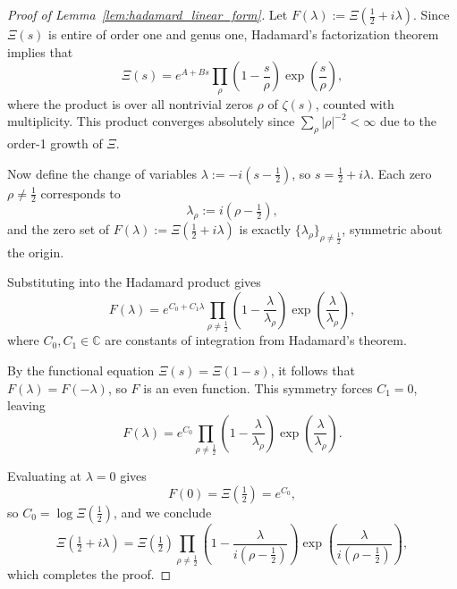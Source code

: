 \begin{proof}[Proof of Lemma~\ref{lem:hadamard_linear_form}]
Let \( F(\lambda) := \Xi\left( \tfrac{1}{2} + i\lambda \right) \). Since \( \Xi(s) \) is entire of order one and genus one, Hadamard’s factorization theorem \cite[Theorem~3.7.1]{Levin1996EntireLectures} implies that
\[
\Xi(s) = e^{A + B s} \prod_{\rho} \left( 1 - \frac{s}{\rho} \right) \exp\left( \frac{s}{\rho} \right),
\]
where the product is over all nontrivial zeros \( \rho \) of \( \zeta(s) \), counted with multiplicity. This product converges absolutely since \( \sum_\rho |\rho|^{-2} < \infty \) due to the order-1 growth of \( \Xi \).

\medskip
Now define the change of variables \( \lambda := -i(s - \tfrac{1}{2}) \), so \( s = \tfrac{1}{2} + i\lambda \). Each zero \( \rho \ne \tfrac{1}{2} \) corresponds to
\[
\lambda_\rho := i(\rho - \tfrac{1}{2}),
\]
and the zero set of \( F(\lambda) := \Xi(\tfrac{1}{2} + i\lambda) \) is exactly \( \{ \lambda_\rho \}_{\rho \ne \tfrac{1}{2}} \), symmetric about the origin.

Substituting into the Hadamard product gives
\[
F(\lambda) = e^{C_0 + C_1 \lambda} \prod_{\rho \ne \tfrac{1}{2}} \left( 1 - \frac{\lambda}{\lambda_\rho} \right) \exp\left( \frac{\lambda}{\lambda_\rho} \right),
\]
where \( C_0, C_1 \in \mathbb{C} \) are constants of integration from Hadamard's theorem.

\medskip
By the functional equation \( \Xi(s) = \Xi(1 - s) \), it follows that \( F(\lambda) = F(-\lambda) \), so \( F \) is an even function. This symmetry forces \( C_1 = 0 \), leaving
\[
F(\lambda) = e^{C_0} \prod_{\rho \ne \tfrac{1}{2}} \left( 1 - \frac{\lambda}{\lambda_\rho} \right) \exp\left( \frac{\lambda}{\lambda_\rho} \right).
\]

Evaluating at \( \lambda = 0 \) gives
\[
F(0) = \Xi\left( \tfrac{1}{2} \right) = e^{C_0},
\]
so \( C_0 = \log \Xi(\tfrac{1}{2}) \), and we conclude
\[
\Xi\left( \tfrac{1}{2} + i\lambda \right)
= \Xi\left( \tfrac{1}{2} \right) \prod_{\rho \ne \tfrac{1}{2}} \left( 1 - \frac{\lambda}{i(\rho - \tfrac{1}{2})} \right) \exp\left( \frac{\lambda}{i(\rho - \tfrac{1}{2})} \right),
\]
which completes the proof.
\end{proof}
%  